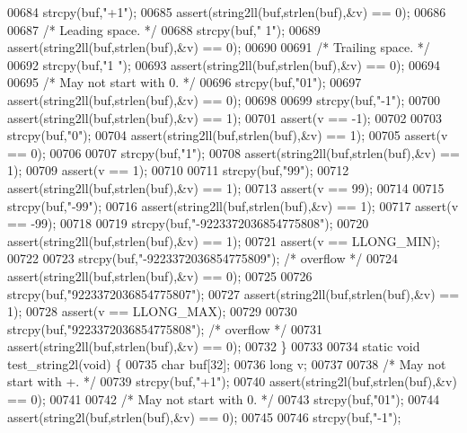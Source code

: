 \begin{DoxyCode}
{{{00684     strcpy(buf,\textcolor{stringliteral}{"+1"});
00685     assert(string2ll(buf,strlen(buf),&v) == 0);
00686 
00687     \textcolor{comment}{/* Leading space. */}
00688     strcpy(buf,\textcolor{stringliteral}{" 1"});
00689     assert(string2ll(buf,strlen(buf),&v) == 0);
00690 
00691     \textcolor{comment}{/* Trailing space. */}
00692     strcpy(buf,\textcolor{stringliteral}{"1 "});
00693     assert(string2ll(buf,strlen(buf),&v) == 0);
00694 
00695     \textcolor{comment}{/* May not start with 0. */}
00696     strcpy(buf,\textcolor{stringliteral}{"01"});
00697     assert(string2ll(buf,strlen(buf),&v) == 0);
00698 
00699     strcpy(buf,\textcolor{stringliteral}{"-1"});
00700     assert(string2ll(buf,strlen(buf),&v) == 1);
00701     assert(v == -1);
00702 
00703     strcpy(buf,\textcolor{stringliteral}{"0"});
00704     assert(string2ll(buf,strlen(buf),&v) == 1);
00705     assert(v == 0);
00706 
00707     strcpy(buf,\textcolor{stringliteral}{"1"});
00708     assert(string2ll(buf,strlen(buf),&v) == 1);
00709     assert(v == 1);
00710 
00711     strcpy(buf,\textcolor{stringliteral}{"99"});
00712     assert(string2ll(buf,strlen(buf),&v) == 1);
00713     assert(v == 99);
00714 
00715     strcpy(buf,\textcolor{stringliteral}{"-99"});
00716     assert(string2ll(buf,strlen(buf),&v) == 1);
00717     assert(v == -99);
00718 
00719     strcpy(buf,\textcolor{stringliteral}{"-9223372036854775808"});
00720     assert(string2ll(buf,strlen(buf),&v) == 1);
00721     assert(v == LLONG\_MIN);
00722 
00723     strcpy(buf,\textcolor{stringliteral}{"-9223372036854775809"}); \textcolor{comment}{/* overflow */}
00724     assert(string2ll(buf,strlen(buf),&v) == 0);
00725 
00726     strcpy(buf,\textcolor{stringliteral}{"9223372036854775807"});
00727     assert(string2ll(buf,strlen(buf),&v) == 1);
00728     assert(v == LLONG\_MAX);
00729 
00730     strcpy(buf,\textcolor{stringliteral}{"9223372036854775808"}); \textcolor{comment}{/* overflow */}
00731     assert(string2ll(buf,strlen(buf),&v) == 0);
00732 \}
00733 
00734 \textcolor{keyword}{static} \textcolor{keywordtype}{void} test\_string2l(\textcolor{keywordtype}{void}) \{
00735     \textcolor{keywordtype}{char} buf[32];
00736     \textcolor{keywordtype}{long} v;
00737 
00738     \textcolor{comment}{/* May not start with +. */}
00739     strcpy(buf,\textcolor{stringliteral}{"+1"});
00740     assert(string2l(buf,strlen(buf),&v) == 0);
00741 
00742     \textcolor{comment}{/* May not start with 0. */}
00743     strcpy(buf,\textcolor{stringliteral}{"01"});
00744     assert(string2l(buf,strlen(buf),&v) == 0);
00745 
00746     strcpy(buf,\textcolor{stringliteral}{"-1"});
}}}
\end{DoxyCode}
